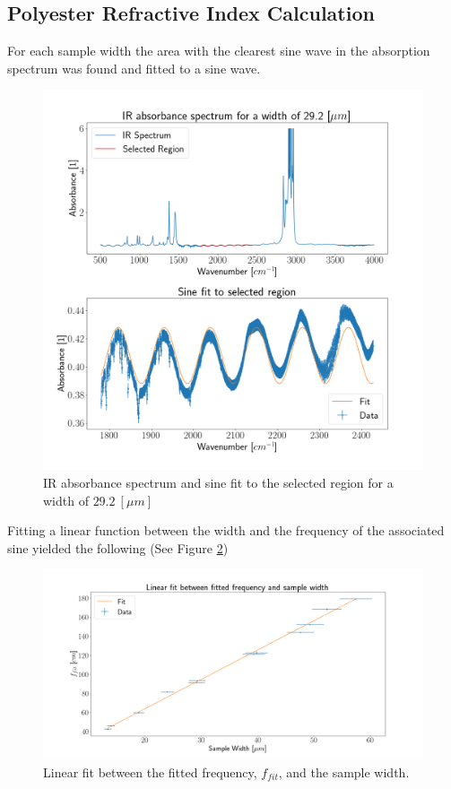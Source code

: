 \documentclass[reprint,amsmath,amssymb,aps, prl]{revtex4-2}
\begin{document}
\subsection{Polyester Refractive Index Calculation}
For each sample width the area with the clearest sine wave in the absorption spectrum was found and fitted to a sine wave.
\begin{figure}[h]
    \label{fig:SineFitEx}
    \includegraphics[width=\linewidth]{Images/29_2_Spec.png}
    \caption{IR absorbance spectrum and sine fit to the selected region for a width of $29.2\ [\mu m]$}
    \centering
\end{figure}
Fitting a linear function between the width and the frequency of the associated sine yielded the following (See Figure \ref{fig:ThinLinWidthFreq})
\begin{figure}[h]
    \label{fig:ThinLinWidthFreq}
    \includegraphics[width=\linewidth]{Images/__linear_fit.png}
    \caption{Linear fit between the fitted frequency, $f_{fit}$, and the sample width.}
    \centering
\end{figure}
\end{document}
